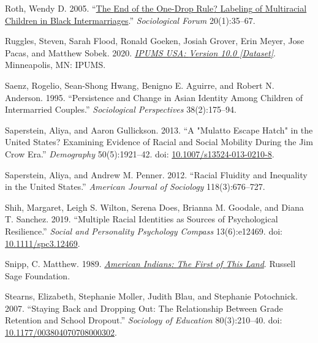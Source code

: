 \documentclass[
  letterpaper,
  DIV=11,
  numbers=noendperiod]{scrartcl}
\newlength{\cslhangindent}
\newlength{\cslentryspacingunit} %
\newenvironment{CSLReferences}[2] %
 {%
  \setlength{\parindent}{0pt}
  \ifodd #1
  \let\oldpar\par
  \def\par{\hangindent=\cslhangindent\oldpar}
  \fi
  \setlength{\parskip}{#2\cslentryspacingunit}
 }%
 {}
\begin{document}
\begin{CSLReferences}{1}{0}
\leavevmode{}%
Roth, Wendy D. 2005. {``\href{http://www.jstor.org/stable/4540881}{The
{End} of the {One-Drop Rule}? {Labeling} of {Multiracial Children} in
{Black Intermarriages}}.''} \emph{Sociological Forum} 20(1):35--67.

\leavevmode{}%
Ruggles, Steven, Sarah Flood, Ronald Goeken, Josiah Grover, Erin Meyer,
Jose Pacas, and Matthew Sobek. 2020.
\emph{\href{https://doi.org/10.18128/D010.V10.0}{{IPUMS USA}: {Version}
10.0 {[}Dataset{]}}}. {Minneapolis, MN}: {IPUMS}.

\leavevmode{}%
Saenz, Rogelio, Sean-Shong Hwang, Benigno E. Aguirre, and Robert N.
Anderson. 1995. {``Persistence and {Change} in {Asian Identity Among
Children} of {Intermarried Couples}.''} \emph{Sociological Perspectives}
38(2):175--94.

\leavevmode{}%
Saperstein, Aliya, and Aaron Gullickson. 2013. {``A "{Mulatto Escape
Hatch}" in the {United States}? {Examining Evidence} of {Racial} and
{Social Mobility During} the {Jim Crow Era}.''} \emph{Demography}
50(5):1921--42. doi:
\href{https://doi.org/10.1007/s13524-013-0210-8}{10.1007/s13524-013-0210-8}.

\leavevmode{}%
Saperstein, Aliya, and Andrew M. Penner. 2012. {``Racial {Fluidity} and
{Inequality} in the {United States}.''} \emph{American Journal of
Sociology} 118(3):676--727.

\leavevmode{}%
Shih, Margaret, Leigh S. Wilton, Serena Does, Brianna M. Goodale, and
Diana T. Sanchez. 2019. {``Multiple Racial Identities as Sources of
Psychological Resilience.''} \emph{Social and Personality Psychology
Compass} 13(6):e12469. doi:
\href{https://doi.org/10.1111/spc3.12469}{10.1111/spc3.12469}.

\leavevmode{}%
Snipp, C. Matthew. 1989.
\emph{\href{https://books.google.com?id=E0CsvVoVA90C}{American
{Indians}: {The First} of {This Land}}}. {Russell Sage Foundation}.

\leavevmode{}%
Stearns, Elizabeth, Stephanie Moller, Judith Blau, and Stephanie
Potochnick. 2007. {``Staying {Back} and {Dropping Out}: {The
Relationship Between Grade Retention} and {School Dropout}.''}
\emph{Sociology of Education} 80(3):210--40. doi:
\href{https://doi.org/10.1177/003804070708000302}{10.1177/003804070708000302}.


\end{CSLReferences}
\end{document}
